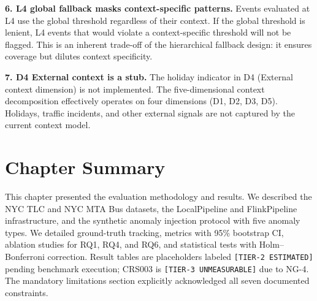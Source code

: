 \textbf{6. L4 global fallback masks context-specific patterns.} Events
evaluated at L4 use the global threshold regardless of their context.
If the global threshold is lenient, L4 events that would violate a
context-specific threshold will not be flagged. This is an inherent
trade-off of the hierarchical fallback design: it ensures coverage but
dilutes context specificity.

\textbf{7. D4 External context is a stub.} The holiday indicator in
D4 (External context dimension) is not implemented. The five-dimensional
context decomposition effectively operates on four dimensions (D1, D2, D3,
D5). Holidays, traffic incidents, and other external signals are not
captured by the current context model.

\section{Chapter Summary}
\label{sec:ch3-summary}

This chapter presented the evaluation methodology and results. We described
the NYC TLC and NYC MTA Bus datasets, the LocalPipeline and FlinkPipeline
infrastructure, and the synthetic anomaly injection protocol with five anomaly
types. We detailed ground-truth tracking, metrics with 95\% bootstrap CI,
ablation studies for RQ1, RQ4, and RQ6, and statistical tests with
Holm--Bonferroni correction. Result tables are placeholders labeled
\texttt{[TIER-2\ ESTIMATED]} pending benchmark execution; CRS003 is
\texttt{[TIER-3\ UNMEASURABLE]} due to NG-4. The mandatory limitations
section explicitly acknowledged all seven documented constraints.
